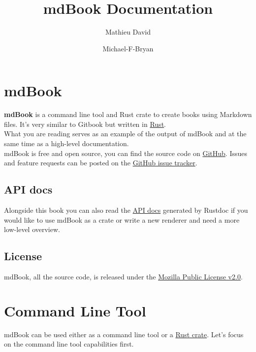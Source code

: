 \documentclass{article}
\title{mdBook Documentation}\author{Mathieu David \and Michael-F-Bryan}
\begin{document}
\maketitle
\clearpage
\tableofcontents
\clearpage

\section{mdBook}
\label{mdBook}
\label{md-book}

\textbf{mdBook} is a command line tool and Rust crate to create books using Markdown
files. It's very similar to Gitbook but written in
\href{http://www.rust-lang.org}{Rust}.\\

What you are reading serves as an example of the output of mdBook and at the
same time as a high-level documentation.\\

mdBook is free and open source, you can find the source code on
\href{https://github.com/rust-lang-nursery/mdBook}{GitHub}. Issues and feature
requests can be posted on the \href{https://github.com/rust-lang-nursery/mdBook/issues}{GitHub issue
tracker}.\\

\subsection{API docs}
\label{API docs}
\label{api-docs}

Alongside this book you can also read the \href{https://docs.rs/mdbook/*/mdbook/}{API
docs} generated by Rustdoc if you would like
to use mdBook as a crate or write a new renderer and need a more low-level
overview.\\

\subsection{License}
\label{License}
\label{license}

mdBook, all the source code, is released under the \href{https://www.mozilla.org/MPL/2.0/}{Mozilla Public License
v2.0}.\\

\section{Command Line Tool}
\label{Command Line Tool}
\label{command-line-tool}

mdBook can be used either as a command line tool or a \href{https://crates.io/crates/mdbook}{Rust
crate}. Let's focus on the command line tool
capabilities first.\\
\end{document}
